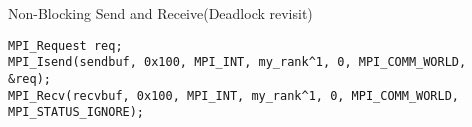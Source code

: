 \begin{frame}[fragile]{Non-Blocking Send and Receive(Deadlock revisit)}
\begin{verbatim}
MPI_Request req;
MPI_Isend(sendbuf, 0x100, MPI_INT, my_rank^1, 0, MPI_COMM_WORLD, &req);
MPI_Recv(recvbuf, 0x100, MPI_INT, my_rank^1, 0, MPI_COMM_WORLD, MPI_STATUS_IGNORE);
\end{verbatim}
\end{frame}